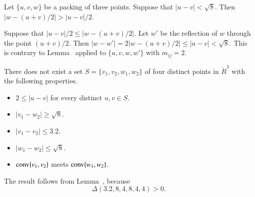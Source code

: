 \begin{tarskidata}
\begin{tarski}
\begin{lemma}
  Let $\{u,v,w\}$ be a packing of three points.  Suppose that 
$|u-v| <\sqrt8$.  Then $|w- (u+v)/2| > |u-v|/2$.
\end{lemma}

\begin{proved} Suppose that $|u-v|/2\le |w-(u+v)/2|$.
Let $w'$ be the reflection of $w$ through the point
$(u+v)/2$.  Then $|w-w'| = 2|w-(u+v)/2|\le |u-v| <\sqrt8$.
This is contrary to Lemma~ applied to
$\{u,v,w,w'\}$ with $m_{ij}=2$.  
\swallowed\end{proved}
\end{tarski}







\begin{tarski}

\begin{lemma} 
There does not exist a set
$S=\{v_1,v_2,w_1,w_2\}$ of four distinct points
in $\ring{R}^3$ with the following properties.
\begin{itemize}
	\item $2\le |u-v|$ for every distinct $u,v\in S$.
          \item $|v_1-w_2|\ge \sqrt{8}$.
		\item $ |v_1-v_2| \le 3.2$.
	\item $|w_1-w_2|\le \sqrt{8}$.
	\item ${\operatorname{conv}}\{v_1,v_2\}$ meets
		${\operatorname{conv}}\{w_1,w_2\}$.
\end{itemize}
\end{lemma}


\begin{proved} The result follows from Lemma~,
because
  $$
  \Delta(3.2,8,4,8,4,4) > 0.
  $$
\swallowed\end{proved}
\end{tarski}






\end{tarskidata}
